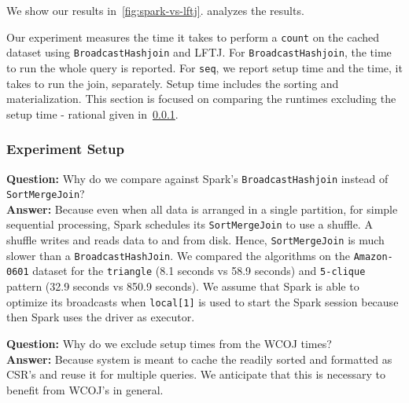 We show our results in~\cref{fig:spark-vs-lftj}.
 analyzes the results.

Our experiment measures the time it takes to perform a \texttt{count} on the cached dataset using \texttt{BroadcastHashjoin} and
\textsc{LFTJ}.
For \texttt{BroadcastHashjoin}, the time to run the whole query is reported.
For \texttt{seq}, we report setup time and the time, it takes to run the join, separately.
Setup time includes the sorting and materialization.
This section is focused on comparing the runtimes excluding the setup time - rational given in~\cref{sssec:seq-experiment-rational}.

\subsubsection{Experiment Setup}\label{sssec:seq-experiment-rational}
\textbf{Question:} Why do we compare against Spark's \texttt{BroadcastHashjoin} instead of \texttt{SortMergeJoin}? \\
\textbf{Answer:} Because even when all data is arranged in a single partition, for simple sequential processing, Spark
schedules its \texttt{SortMergeJoin} to use a shuffle.
A shuffle writes and reads data to and from disk.
Hence, \texttt{SortMergeJoin} is much slower than a \texttt{BroadcastHashJoin}.
We compared the algorithms on the \texttt{Amazon-0601} dataset for the \texttt{triangle} (8.1 seconds vs 58.9 seconds) and
\texttt{5-clique} pattern (32.9 seconds vs 850.9 seconds).
We assume that Spark is able to optimize its broadcasts when \texttt{local[1]} is used to start the Spark session because then Spark uses the driver as executor.

\textbf{Question:} Why do we exclude setup times from the WCOJ times?\\
\textbf{Answer:} Because system is meant to cache the readily sorted and formatted as \textsc{CSR}'s and reuse it for multiple queries.
We anticipate that this is necessary to benefit from \textsc{WCOJ}'s in general.



